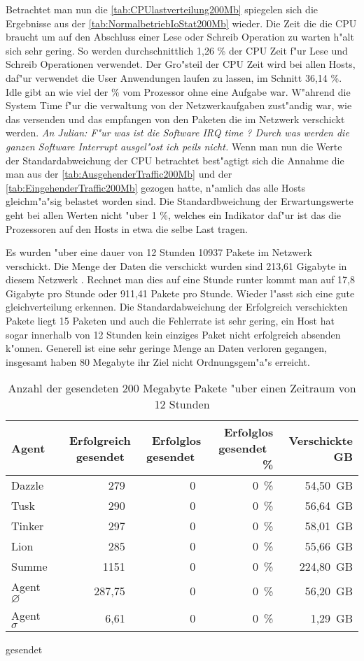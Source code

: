 Betrachtet man nun die \cref{tab:CPUlastverteilung200Mb} spiegelen sich die Ergebnisse aus der \cref{tab:NormalbetriebIoStat200Mb} wieder. %
Die Zeit die die CPU braucht um auf den Abschluss einer Lese oder Schreib Operation zu warten h"alt sich sehr gering. %
So werden durchschnittlich 1,26 \% der CPU Zeit f"ur Lese und Schreib Operationen verwendet. Der Gro"steil der CPU Zeit wird %
bei allen Hosts, daf"ur verwendet die User Anwendungen laufen zu lassen, im Schnitt 36,14 \%. Idle gibt an wie viel der \% vom Prozessor %
ohne eine Aufgabe war. W"ahrend die System Time f"ur die verwaltung von der Netzwerkaufgaben zust"andig war, wie das versenden und das empfangen von %
den Paketen die im Netzwerk verschickt werden. \emph{An Julian: F"ur was ist die Software IRQ time ? Durch was werden die ganzen Software Interrupt %
ausgel"ost ich peils nicht.}%
Wenn man nun die Werte der Standardabweichung der CPU betrachtet best"agtigt sich die Annahme die man aus der %
\cref{tab:AusgehenderTraffic200Mb} und der \cref{tab:EingehenderTraffic200Mb} gezogen hatte, n"amlich das alle Hosts gleichm"a"sig belastet worden sind. %
Die Standardbweichung der Erwartungswerte geht bei allen Werten nicht "uber 1 \%, welches ein Indikator daf"ur ist das die %
Prozessoren auf den Hosts in etwa die selbe Last tragen.  

Es wurden "uber eine dauer von 12 Stunden 10937 Pakete im Netzwerk verschickt. Die Menge der Daten die verschickt wurden sind 213,61 Gigabyte in diesem Netzwerk . %
Rechnet man dies auf eine Stunde runter kommt man auf 17,8 Gigabyte pro Stunde oder 911,41 Pakete pro Stunde. Wieder l"asst sich eine gute gleichverteilung erkennen. %
Die Standardabweichung der Erfolgreich verschickten Pakete liegt 15 Paketen und auch die Fehlerrate ist sehr gering, ein Host %
hat sogar innerhalb von 12 Stunden kein einziges Paket nicht erfolgreich absenden k"onnen. Generell ist eine sehr geringe Menge an Daten verloren %
gegangen, insgesamt haben 80 Megabyte ihr Ziel nicht Ordnungsgem"a"s erreicht. %
\begin{table}
\centering
\begin{tabular}{l%
 r<{\,}%
 r<{\,}%
 r<{\,\%}%
 r<{\,GB}%
}
Agent  				& Erfolgreich gesendet			& Erfolglos gesendet			& Erfolglos gesendet	& Verschickte	\\
\hline
Dazzle 				& 279			 		& 0					& 0			& 54,50			\\
Tusk 				& 290					& 0					& 0			& 56,64			\\
Tinker				& 297					& 0					& 0			& 58,01			\\
Lion				& 285					& 0					& 0			& 55,66			\\ 
Summe				& 1151					& 0					& 0 			& 224,80		\\
Agent $\diameter $  		& 287,75				& 0				 	& 0			& 56,20 		\\   
Agent $\sigma $			& 6,61		 			& 0					& 0      		& 1,29		\\
\end{tabular}
gesendet\caption{Anzahl der gesendeten 200 Megabyte Pakete "uber einen Zeitraum von 12 Stunden}
\label{tab:VerschickteDaten200Mb}
\end{table}



